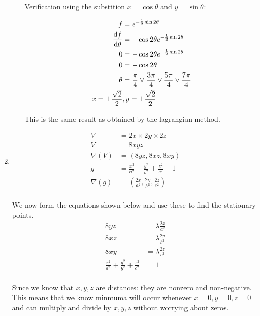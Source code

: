 \documentclass[10pt,\jkfside,a4paper]{article}
\begin{document}
\begin{enumerate}
\begin{enumerate}
Verification using the substition $x = \cos \theta$ and $y = \sin \theta$:

\begin{equation}
\begin{split}
f &= e^{-\frac{1}{2}\sin2\theta} \\
\dv{f}{\theta} &= -\cos2\theta e^{-\frac{1}{2}\sin2\theta} \\
0 &= -\cos2\theta e^{-\frac{1}{2}\sin2\theta} \\
0 &= -\cos2\theta \\
\theta &= \frac{\pi}{4} \vee \frac{3\pi}{4} \vee \frac{5\pi}{4} \vee \frac{7\pi}{4} \\
x = \pm \frac{\sqrt{2}}{2}&, y = \pm \frac{\sqrt{2}}{2} \\
\end{split}
\end{equation}

This is the same result as obtained by the lagrangian method.

\end{enumerate}

\item 
\begin{equation}
\begin{split}
V &= 2x \times 2y \times 2z \\ 
V &= 8xyz \\
\nabla(V) &= (8yz, 8xz, 8xy) \\
g &= \frac{x^{2}}{a^2} + \frac{y^{2}}{b^2} + \frac{z^2}{c^2} - 1 \\
\nabla(g) &= \left(\frac{2x}{a^2}, \frac{2y}{b^2}, \frac{2z}{c^2}\right) \\
\end{split}
\end{equation}

We now form the equations shown below and use these to find the stationary points.
\begin{equation}
\begin{split}
8yz &= \lambda\frac{2x}{a^2} \\
8xz &= \lambda\frac{2y}{b^2} \\
8xy &= \lambda\frac{2z}{c^2} \\
\frac{x^{2}}{a^2} + \frac{y^{2}}{b^2} + \frac{z^2}{c^2} &= 1 \\
\end{split}
\end{equation}

Since we know that $x, y, z$ are distances: they are nonzero and non-negative. This 
means that we know minmuma will occur whenever $x = 0, y = 0, z = 0$ and can 
multiply and divide by $x, y, z$ without worrying about zeros.


\end{enumerate}
\end{document}
